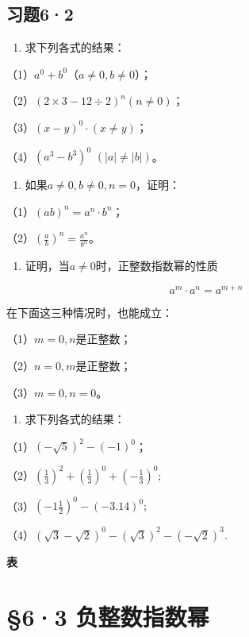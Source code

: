 \subsection{习题6·2}

\begin{enumerate}
\item
  求下列各式的结果：
\end{enumerate}

（1）\(a^0 + b^0\)（\(a \neq 0, b \neq 0\)）；

（2）\((2 \times 3 - 12 \div 2)^{n} (n \neq 0)\)；

（3）\((x - y)^{0} \cdot (x \neq y)\)；

（4）\((a^3 - b^3)^0\) \((|a| \neq |b|)\)。

\begin{enumerate}[start=2]
\item
  如果\(a \neq 0, b \neq 0, n = 0\)，证明：
\end{enumerate}

（1）\((ab)^{n} = a^{n} \cdot b^{n}\)；

（2）\(\left(\frac{a}{b}\right)^n = \frac{a^n}{b^n}\)。

\begin{enumerate}[start=3]
\item
  证明，当\(a \neq 0\)时，正整数指数幂的性质
\end{enumerate}

\[
a ^ {m} \cdot a ^ {n} = a ^ {m + n}
\]

在下面这三种情况时，也能成立：

（1）\(m = 0, n\)是正整数；

（2）\(n = 0, m\)是正整数；

（3）\(m = 0, n = 0\)。

\begin{enumerate}[start=4]
\item
  求下列各式的结果：
\end{enumerate}

（1）\((- \sqrt{5})^2 - (-1)^0\)；

（2）\(\left(\frac{1}{3}\right)^2 + \left(\frac{1}{3}\right)^0 + \left(-\frac{1}{3}\right)^0;\)

（3）\(\left(-1\frac{1}{2}\right)^0 - (-3.14)^0;\)

（4）\((\sqrt{3} - \sqrt{2})^0 - (\sqrt{3})^2 - (-\sqrt{2})^3.\)

\textbf{表}

\section{§6·3 负整数指数幂}

